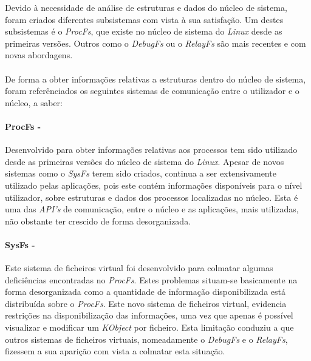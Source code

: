 Devido à necessidade de análise de estruturas e dados do núcleo de sistema, foram criados diferentes subsistemas com vista à sua satisfação.
Um destes subsistemas é o \textit{ProcFs}, que existe no núcleo de sistema do \textit{Linux} desde as primeiras versões.
Outros como o \textit{DebugFs} ou o \textit{RelayFs} são mais recentes e com novas abordagens.

\paragraph*{}
De forma a obter informações relativas a estruturas dentro do núcleo de sistema, foram referênciados os seguintes sistemas de comunicação entre o utilizador e o núcleo, a saber:

\paragraph*{ProcFs - }\label{cap:ProcFs_overview}

Desenvolvido para obter informações relativas aos processos tem sido utilizado desde as primeiras versões do núcleo de sistema do \textit{Linux}.
Apesar de novos sistemas como o \textit{SysFs} terem sido criados, continua a ser extensivamente utilizado pelas aplicações, pois este contém informações disponíveis para o nível utilizador, sobre estruturas e dados dos processos localizadas no núcleo.
Esta é uma das \textit{API's} de comunicação, entre o núcleo e as aplicações, mais utilizadas, não obstante ter crescido de forma desorganizada.

\paragraph*{SysFs - }\label{cap:SysFs_overview}

Este sistema de ficheiros virtual foi desenvolvido para colmatar algumas deficiências encontradas no \textit{ProcFs}.
Estes problemas situam-se basicamente na forma desorganizada como a quantidade de informação disponibilizada está distribuída sobre o \textit{ProcFs}.
Este novo sistema de ficheiros virtual, evidencia restrições na disponibilização das informações, uma vez que apenas é possível visualizar e modificar um \textit{KObject} por ficheiro.
Esta limitação conduziu a que outros sistemas de ficheiros virtuais, nomeadamente o \textit{DebugFs} e o \textit{RelayFs}, fizessem a sua aparição com vista a colmatar esta situação.

